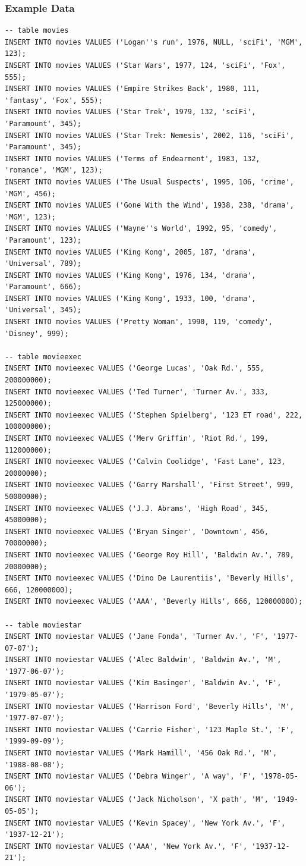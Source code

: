 \documentclass{cshwk}
\begin{document}
\subsubsection{Example Data}
\begin{lstlisting}
-- table movies
INSERT INTO movies VALUES ('Logan''s run', 1976, NULL, 'sciFi', 'MGM', 123);
INSERT INTO movies VALUES ('Star Wars', 1977, 124, 'sciFi', 'Fox', 555);
INSERT INTO movies VALUES ('Empire Strikes Back', 1980, 111, 'fantasy', 'Fox', 555);
INSERT INTO movies VALUES ('Star Trek', 1979, 132, 'sciFi', 'Paramount', 345);
INSERT INTO movies VALUES ('Star Trek: Nemesis', 2002, 116, 'sciFi', 'Paramount', 345);
INSERT INTO movies VALUES ('Terms of Endearment', 1983, 132, 'romance', 'MGM', 123);
INSERT INTO movies VALUES ('The Usual Suspects', 1995, 106, 'crime', 'MGM', 456);
INSERT INTO movies VALUES ('Gone With the Wind', 1938, 238, 'drama', 'MGM', 123);
INSERT INTO movies VALUES ('Wayne''s World', 1992, 95, 'comedy', 'Paramount', 123);
INSERT INTO movies VALUES ('King Kong', 2005, 187, 'drama', 'Universal', 789);
INSERT INTO movies VALUES ('King Kong', 1976, 134, 'drama', 'Paramount', 666);
INSERT INTO movies VALUES ('King Kong', 1933, 100, 'drama', 'Universal', 345);
INSERT INTO movies VALUES ('Pretty Woman', 1990, 119, 'comedy', 'Disney', 999);

-- table movieexec
INSERT INTO movieexec VALUES ('George Lucas', 'Oak Rd.', 555, 200000000);
INSERT INTO movieexec VALUES ('Ted Turner', 'Turner Av.', 333, 125000000);
INSERT INTO movieexec VALUES ('Stephen Spielberg', '123 ET road', 222, 100000000);
INSERT INTO movieexec VALUES ('Merv Griffin', 'Riot Rd.', 199, 112000000);
INSERT INTO movieexec VALUES ('Calvin Coolidge', 'Fast Lane', 123, 20000000);
INSERT INTO movieexec VALUES ('Garry Marshall', 'First Street', 999, 50000000);
INSERT INTO movieexec VALUES ('J.J. Abrams', 'High Road', 345, 45000000);
INSERT INTO movieexec VALUES ('Bryan Singer', 'Downtown', 456, 70000000);
INSERT INTO movieexec VALUES ('George Roy Hill', 'Baldwin Av.', 789, 20000000);
INSERT INTO movieexec VALUES ('Dino De Laurentiis', 'Beverly Hills', 666, 120000000);
INSERT INTO movieexec VALUES ('AAA', 'Beverly Hills', 666, 120000000);

-- table moviestar
INSERT INTO moviestar VALUES ('Jane Fonda', 'Turner Av.', 'F', '1977-07-07');
INSERT INTO moviestar VALUES ('Alec Baldwin', 'Baldwin Av.', 'M', '1977-06-07');
INSERT INTO moviestar VALUES ('Kim Basinger', 'Baldwin Av.', 'F', '1979-05-07');
INSERT INTO moviestar VALUES ('Harrison Ford', 'Beverly Hills', 'M', '1977-07-07');
INSERT INTO moviestar VALUES ('Carrie Fisher', '123 Maple St.', 'F', '1999-09-09');
INSERT INTO moviestar VALUES ('Mark Hamill', '456 Oak Rd.', 'M', '1988-08-08');
INSERT INTO moviestar VALUES ('Debra Winger', 'A way', 'F', '1978-05-06');
INSERT INTO moviestar VALUES ('Jack Nicholson', 'X path', 'M', '1949-05-05');
INSERT INTO moviestar VALUES ('Kevin Spacey', 'New York Av.', 'F', '1937-12-21');
INSERT INTO moviestar VALUES ('AAA', 'New York Av.', 'F', '1937-12-21');


\end{lstlisting}
\end{document}

